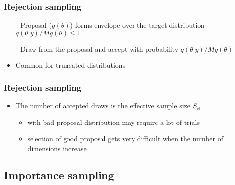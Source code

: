 \documentclass[10pt]{beamer}
\begin{document}
\begin{frame}

\frametitle{Rejection sampling}

    \vspace{-.3\baselineskip}
  \begin{itemize}
  \item[-] Proposal ($g(\theta)$) forms envelope over the target distribution ${q(\theta|y)}/{M g(\theta)} \leq 1$
  \item[-] Draw from the proposal and accept with probability ${q(\theta|y)}/{M g(\theta)}$
  \item<3>[-] Common for truncated distributions
  \end{itemize}

  \begin{center}
    \vspace{-1.6\baselineskip}
  \end{center}

\end{frame}

\begin{frame}
\frametitle{Rejection sampling}

\begin{itemize}
  \item The number of accepted draws is the effective sample size $S_\text{eff}$

  \pause
    \begin{itemize}
    \item with bad proposal distribution may require a lot of trials
    \item selection of good proposal gets very difficult when
      the number of dimensions increase
    \end{itemize}
  \end{itemize}

\end{frame}

\subsection{Importance sampling}
\frame{\subsectionpage}
\end{document}

